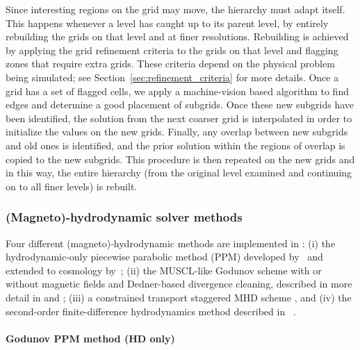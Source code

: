 Since interesting regions on the grid may move, the hierarchy must
adapt itself. This happens whenever a level has caught up to its
parent level, by entirely rebuilding the grids on that level and at
finer resolutions. Rebuilding is achieved by applying the grid
refinement criteria to the grids on that level and flagging zones that
require extra grids.  These criteria depend on the physical problem
being simulated; see Section~\ref{sec:refinement_criteria} for more
details.  Once a grid has a set of flagged cells, we apply a
machine-vision based algorithm \citep{Berger91} to find edges and
determine a good placement of subgrids.
Once these new subgrids have been identified, the solution from the
next coarser grid is interpolated in order to initialize the values on
the new grids.  Finally, any overlap between new subgrids and old ones
is identified, and the prior solution within the regions of overlap is
copied to the new subgrids. This procedure is then repeated on the new
grids and in this way, the entire hierarchy (from the original level
examined and continuing on to all finer levels) is rebuilt.

\subsubsection{(Magneto)-hydrodynamic solver methods}

Four different (magneto)-hydrodynamic methods are implemented in
\enzo: (i) the hydrodynamic-only piecewise parabolic method (PPM)
developed by~\citet{1984JCoPh..54..174C} and extended to cosmology
by~\citet{1995CoPhC..89..149B}; (ii) the MUSCL-like Godunov scheme
\citep{1977JCoPh..23..276V} with or without magnetic fields and Dedner-based
divergence cleaning, described in more detail in
\citet{WangAbelZhang08} and \citet{WangAbel09}; (iii) a constrained
transport staggered MHD scheme \citep{Collins10}, and (iv) the
second-order finite-difference hydrodynamics method described in
\zeus~\citep{Stone92a,Stone92b}.

\paragraph{Godunov PPM method (HD only)}

